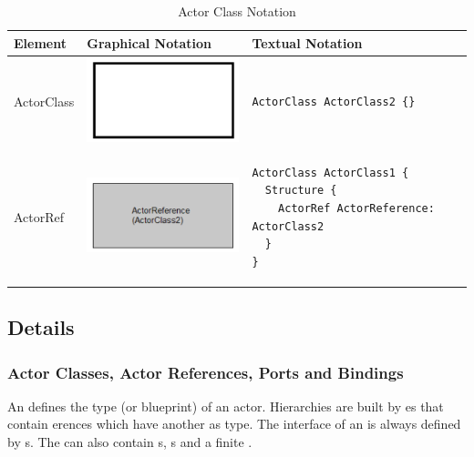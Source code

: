 \begin{table}
\caption{Actor Class Notation}
\begin{tabular}{|l|l|l|}
\hline
 \textbf{Element} & \textbf{Graphical Notation} & \textbf{Textual Notation} \\ \hline
  ActorClass & 
  \includegraphics[scale=0.7]{images/040-ActorClassNotation.png} & 
  \begin{lstlisting}
ActorClass ActorClass2 {}
  \end{lstlisting}
\\ \hline
  ActorRef & \includegraphics[scale=0.7]{images/040-ActorReferenceNotation.png} & 
  \begin{lstlisting}[language=ROOM]
ActorClass ActorClass1 {
  Structure {
    ActorRef ActorReference: ActorClass2
  }
}
  \end{lstlisting}
\\ \hline
\end{tabular}
\end{table}


\subsection{Details}

\subsubsection{Actor Classes, Actor References, Ports and Bindings}

An  defines the type (or blueprint) of an actor. Hierarchies are built by es
that contain erences which have another  as type. The interface of an 
 is always defined by s. The  can also contain
s, s
and a finite . 

